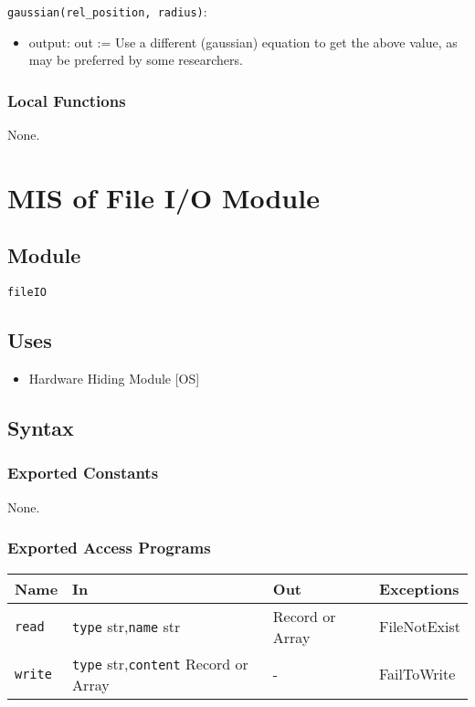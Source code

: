 \documentclass[12pt, titlepage]{article}
\begin{document}
\noindent \texttt{gaussian(rel\_position, radius)}:
\begin{itemize}
  \item output: out := Use a different (gaussian) equation to get the above value, as may be preferred by some researchers.
\end{itemize}

\subsubsection{Local Functions}

None.


\newpage
\section{MIS of File I/O Module} \label{mFile} 

\subsection{Module}
\texttt{fileIO}

\subsection{Uses}
\begin{itemize}
\item Hardware Hiding Module [OS]
\end{itemize}

\subsection{Syntax}

\subsubsection{Exported Constants}
None.

\subsubsection{Exported Access Programs}

\begin{center}
\begin{tabular}{p{2cm} p{5cm} p{3cm} p{4cm}}
\hline
\textbf{Name} & \textbf{In} & \textbf{Out} & \textbf{Exceptions} \\
\hline
\texttt{read} & \texttt{type} str,\newline\texttt{name} str & Record or Array & FileNotExist \\
\texttt{write} & \texttt{type} str,\newline\texttt{content} Record or Array & - & FailToWrite \\
\hline
\end{tabular}
\end{center}
\end{document}
